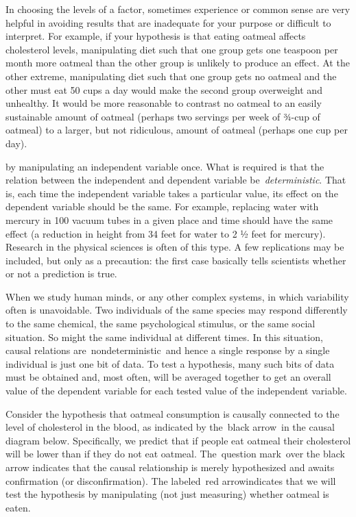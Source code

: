 \begin{refsection}
In choosing the levels of a factor, sometimes experience or common sense are very helpful in avoiding results that are inadequate for your purpose or difficult to interpret. For example, if your hypothesis is that eating oatmeal affects cholesterol levels, manipulating diet such that one group gets one teaspoon per month more oatmeal than the other group is unlikely to produce an effect. At the other extreme, manipulating diet such that one group gets no oatmeal and the other must eat 50 cups a day would make the second group overweight and unhealthy. It would be more reasonable to contrast no oatmeal to an easily sustainable amount of oatmeal (perhaps two servings per week of ¾-cup of oatmeal) to a larger, but not ridiculous, amount of oatmeal (perhaps one cup per day).

 by manipulating an independent variable once. What is required is that the relation between the independent and dependent variable be \emph{deterministic}. That is, each time the independent variable takes a particular value, its effect on the dependent variable should be the same. For example, replacing water with mercury in 100 vacuum tubes in a given place and time should have the same effect (a reduction in height from 34 feet for water to 2 ½ feet for mercury). Research in the physical sciences is often of this type. A few replications may be included, but only as a precaution: the first case basically tells scientists whether or not a prediction is true.

When we study human minds, or any other complex systems, in which variability often is unavoidable. Two individuals of the same species may respond differently to the same chemical, the same psychological stimulus, or the same social situation. So might the same individual at different times. In this situation, causal relations are nondeterministic and hence a single response by a single individual is just one bit of data. To test a hypothesis, many such bits of data must be obtained and, most often, will be averaged together to get an overall value of the dependent variable for each tested value of the independent variable.

Consider the hypothesis that oatmeal consumption is causally connected to the level of cholesterol in the blood, as indicated by the black arrow in the causal diagram below. Specifically, we predict that if people eat oatmeal their cholesterol will be lower than if they do not eat oatmeal. The question mark over the black arrow indicates that the causal relationship is merely hypothesized and awaits confirmation (or disconfirmation). The labeled red arrowindicates that we will test the hypothesis by manipulating (not just measuring) whether oatmeal is eaten.


\end{refsection}
